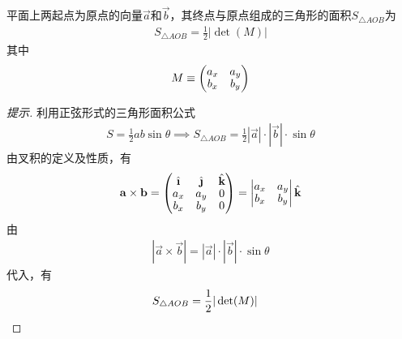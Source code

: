 \begin{lemma}
  平面上两起点为原点的向量$\vec a$和$\vec b$，其终点与原点组成的三角形的面积$S_{\triangle AOB}$为
  \begin{align*}
    S_{\triangle AOB} = \frac12\left| \det(M) \right|
  \end{align*}
  其中
  \begin{align*}\renewcommand{\arraystretch}{.9}
    M\equiv\begin{pmatrix}a_x & a_y\\ b_x & b_y\end{pmatrix}
  \end{align*}

  \centering
\end{lemma}
\begin{proof}[提示]利用正弦形式的三角形面积公式
  \begin{align*}
    S=\frac12 ab\sin\theta\implies
    S_{\triangle AOB} = \frac12 |\vec a| \cdot |\vec b| \cdot \sin\theta
  \end{align*}
  由叉积的定义及性质，有
  \begin{align*}\renewcommand{\arraystretch}{.9}
    \vec a\times \vec b = 
    \begin{pmatrix}
      \ihat & \jhat & \khat\\
      a_x   & a_y   & 0\\
      b_x   & b_y   & 0
    \end{pmatrix} =
    \begin{vmatrix}
      a_x   & a_y\\
      b_x   & b_y
    \end{vmatrix}\khat
  \end{align*}
  由
  \begin{align*}
    \left|\vec a\times \vec b\right| = |\vec a|\cdot|\vec b|\cdot\sin\theta
  \end{align*}
  代入，有
  \begin{align*}
    S_{\triangle AOB} = \frac12 |\det(M)|&\qedhere
  \end{align*}
\end{proof}


